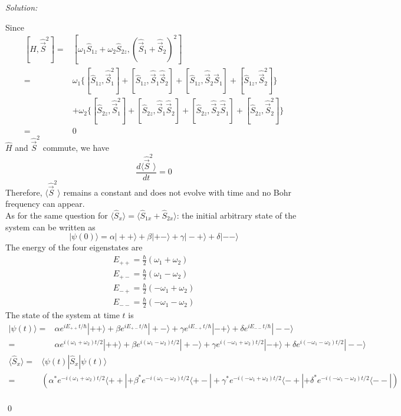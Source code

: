 \documentclass[10pt,a4paper]{article}
\newenvironment{sol}
    {\emph{Solution:}
    }
    {
    \qed
    }
\begin{document}
\begin{sol}
\begin{itemize}
Since
\begin{align}
\nonumber[\hat{H},\hat{\vec{S}}^2]=&[\omega_1\hat{S}_{1z}+\omega_2\hat{S}_{2z},(\hat{\vec{S}}_1+\hat{\vec{S}}_2)^2]\\
\nonumber=&\omega_1\{[\hat{S}_{1z},\hat{\vec{S}}_1^2]+[\hat{S}_{1z},\hat{\vec{S}}_1\hat{\vec{S}}_2]+[\hat{S}_{1z},\hat{\vec{S}}_2\hat{\vec{S}}_1]+[\hat{S}_{1z},\hat{\vec{S}}_2^2]\}\\
\nonumber&+\omega_2\{[\hat{S}_{2z},\hat{\vec{S}}_1^2]+[\hat{S}_{2z},\hat{\vec{S}}_1\hat{\vec{S}}_2]+[\hat{S}_{2z},\hat{\vec{S}}_2\hat{\vec{S}}_1]+[\hat{S}_{2z},\hat{\vec{S}}_2^2]\}\\
=&0
\end{align}
$\hat{H}$ and $\hat{\vec{S}}^2$ commute, we have
\begin{equation}
\frac{d\langle\hat{\vec{S}}^2\rangle}{dt}=0
\end{equation}
Therefore, $\langle\hat{\vec{S}}^2\rangle$ remains a constant and does not evolve with time and no Bohr frequency can appear.\\
As for the same question for $\langle\hat{S}_x\rangle=\langle\hat{S}_{1x}+\hat{S}_{2x}\rangle$: the initial arbitrary state of the system can be written as
\begin{equation}
|\psi(0)\rangle=\alpha|++\rangle+\beta|+-\rangle+\gamma|-+\rangle+\delta|--\rangle
\end{equation}
The energy of the four eigenstates are
\begin{gather}
E_{++}=\frac{\hbar}{2}(\omega_1+\omega_2)\\
E_{+-}=\frac{\hbar}{2}(\omega_1-\omega_2)\\
E_{-+}=\frac{\hbar}{2}(-\omega_1+\omega_2)\\
E_{--}=\frac{\hbar}{2}(-\omega_1-\omega_2)
\end{gather}
The state of the system at time $t$ is
\begin{align}
\nonumber|\psi(t)\rangle=&\alpha e^{iE_{++}t/\hbar}|++\rangle+\beta e^{iE_{+-}t/\hbar}|+-\rangle+\gamma e^{iE_{-+}t/\hbar}|-+\rangle+\delta e^{iE_{--}t/\hbar}|--\rangle\\
=&\alpha e^{i(\omega_1+\omega_2)t/2}|++\rangle+\beta e^{i(\omega_1-\omega_2)t/2}|+-\rangle+\gamma e^{i(-\omega_1+\omega_2)t/2}|-+\rangle+\delta e^{i(-\omega_1-\omega_2)t/2}|--\rangle
\end{align}
\begin{align}
\nonumber\langle\hat{S}_x\rangle=&\langle\psi(t)|\hat{S}_x|\psi(t)\rangle\\
\nonumber=&(\alpha^*e^{-i(\omega_1+\omega_2)t/2}\langle++|+\beta^*e^{-i(\omega_1-\omega_2)t/2}\langle+-|+\gamma^*e^{-i(-\omega_1+\omega_2)t/2}\langle-+|+\delta^*e^{-i(-\omega_1-\omega_2)t/2}\langle--|)\\

\end{align}
\end{itemize}
\end{sol}
\end{document}
